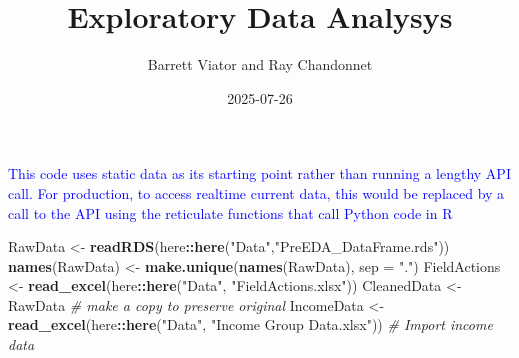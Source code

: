 \documentclass[
]{article}
\title{Exploratory Data Analysys}
\author{Barrett Viator and Ray Chandonnet}
\date{2025-07-26}
\newenvironment{Shaded}{\begin{snugshade}}{\end{snugshade}}
\newcommand{\AttributeTok}[1]{\textcolor[rgb]{0.13,0.29,0.53}{#1}}
\newcommand{\CommentTok}[1]{\textcolor[rgb]{0.56,0.35,0.01}{\textit{#1}}}
\newcommand{\FunctionTok}[1]{\textcolor[rgb]{0.13,0.29,0.53}{\textbf{#1}}}
\newcommand{\NormalTok}[1]{#1}
\newcommand{\OtherTok}[1]{\textcolor[rgb]{0.56,0.35,0.01}{#1}}
\newcommand{\SpecialCharTok}[1]{\textcolor[rgb]{0.81,0.36,0.00}{\textbf{#1}}}
\newcommand{\StringTok}[1]{\textcolor[rgb]{0.31,0.60,0.02}{#1}}
\begin{document}
\maketitle

\textcolor{blue}{This code uses static data as its starting point rather than running a lengthy API call.  For production, to access realtime current data, this would be replaced by a call to the API using the reticulate functions that call Python code in R}

\begin{Shaded}
\begin{Highlighting}[]
\NormalTok{RawData }\OtherTok{\textless{}{-}} \FunctionTok{readRDS}\NormalTok{(here}\SpecialCharTok{::}\FunctionTok{here}\NormalTok{(}\StringTok{"Data"}\NormalTok{,}\StringTok{"PreEDA\_DataFrame.rds"}\NormalTok{))}
\FunctionTok{names}\NormalTok{(RawData) }\OtherTok{\textless{}{-}} \FunctionTok{make.unique}\NormalTok{(}\FunctionTok{names}\NormalTok{(RawData), }\AttributeTok{sep =} \StringTok{"."}\NormalTok{)}
\NormalTok{FieldActions }\OtherTok{\textless{}{-}} \FunctionTok{read\_excel}\NormalTok{(here}\SpecialCharTok{::}\FunctionTok{here}\NormalTok{(}\StringTok{"Data"}\NormalTok{, }\StringTok{"FieldActions.xlsx"}\NormalTok{))}
\NormalTok{CleanedData }\OtherTok{\textless{}{-}}\NormalTok{ RawData }\CommentTok{\# make a copy to preserve original}
\NormalTok{IncomeData }\OtherTok{\textless{}{-}} \FunctionTok{read\_excel}\NormalTok{(here}\SpecialCharTok{::}\FunctionTok{here}\NormalTok{(}\StringTok{"Data"}\NormalTok{, }\StringTok{"Income Group Data.xlsx"}\NormalTok{)) }\CommentTok{\# Import income data}
\end{Highlighting}
\end{Shaded}
\end{document}
